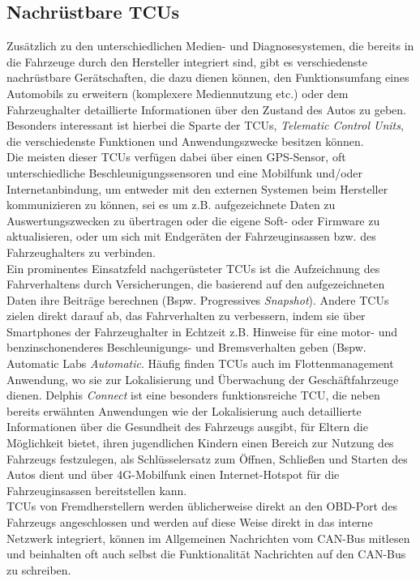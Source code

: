 \documentclass[
    fontsize=12pt,
    headings=small,
    parskip=half,           %
    bibliography=totoc,9
    numbers=noenddot,       %
    open=any,               %
    ]{scrreprt}
\begin{document}
\subsection{Nachrüstbare TCUs}
Zusätzlich zu den unterschiedlichen Medien- und Diagnosesystemen, die bereits in die Fahrzeuge durch den Hersteller integriert sind, gibt es verschiedenste nachrüstbare Gerätschaften, die dazu dienen können, den Funktionsumfang eines Automobils zu erweitern (komplexere Mediennutzung etc.) oder dem Fahrzeughalter detaillierte Informationen über den Zustand des Autos zu geben. Besonders interessant ist hierbei die Sparte der TCUs, \textit{Telematic Control Units}, die verschiedenste Funktionen und Anwendungszwecke besitzen können. \\
Die meisten dieser TCUs verfügen dabei über einen GPS-Sensor, oft unterschiedliche Beschleunigungssensoren und eine Mobilfunk und/oder Internetanbindung, um entweder mit den externen Systemen beim Hersteller kommunizieren zu können, sei es um z.B. aufgezeichnete Daten zu Auswertungszwecken zu übertragen oder die eigene Soft- oder Firmware zu aktualisieren, oder um sich mit Endgeräten der Fahrzeuginsassen bzw. des Fahrzeughalters zu verbinden. \\
Ein prominentes Einsatzfeld nachgerüsteter TCUs ist die Aufzeichnung des Fahrverhaltens durch Versicherungen, die basierend auf den aufgezeichneten Daten ihre Beiträge berechnen (Bspw. Progressives \textit{Snapshot}). Andere TCUs zielen direkt darauf ab, das Fahrverhalten zu verbessern, indem sie über Smartphones der Fahrzeughalter in Echtzeit z.B. Hinweise für eine motor- und benzinschonenderes Beschleunigungs- und Bremsverhalten geben (Bspw. Automatic Labs \textit{Automatic}.
Häufig finden TCUs auch im Flottenmanagement Anwendung, wo sie zur Lokalisierung und Überwachung der Geschäftfahrzeuge dienen. Delphis \textit{Connect} ist eine besonders funktionsreiche TCU, die neben bereits erwähnten Anwendungen wie der Lokalisierung auch detaillierte Informationen über die Gesundheit des Fahrzeugs ausgibt, für Eltern die Möglichkeit bietet, ihren jugendlichen Kindern einen Bereich zur Nutzung des Fahrzeugs festzulegen, als Schlüsselersatz zum Öffnen, Schließen und Starten des Autos dient und über 4G-Mobilfunk einen Internet-Hotspot für die Fahrzeuginsassen bereitstellen kann. \\
TCUs von Fremdherstellern werden üblicherweise direkt an den OBD-Port des Fahrzeugs angeschlossen und werden auf diese Weise direkt in das interne Netzwerk integriert, können im Allgemeinen Nachrichten vom CAN-Bus mitlesen und beinhalten oft auch selbst die Funktionalität Nachrichten auf den CAN-Bus zu schreiben.
\end{document}
